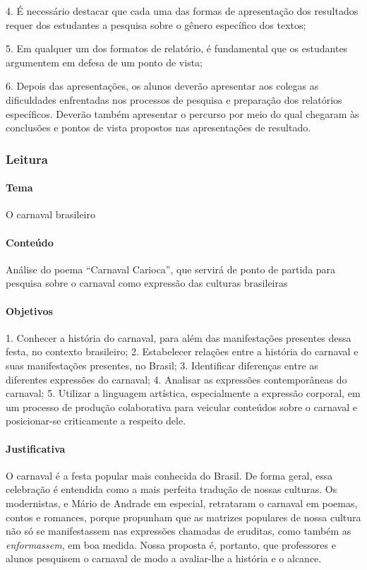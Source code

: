 \documentclass[11pt]{extarticle}
\begin{document}
4. É necessário destacar que cada uma das formas de apresentação dos
resultados requer dos estudantes a pesquisa sobre o gênero específico
dos textos;

\vspace{3mm}

5. Em qualquer um dos formatos de relatório, é fundamental que os
estudantes argumentem em defesa de um ponto de vista;

\vspace{3mm}

6. Depois das apresentações, os alunos deverão apresentar aos colegas as
dificuldades enfrentadas nos processos de pesquisa e preparação dos
relatórios específicos. Deverão também apresentar o percurso por meio do
qual chegaram às conclusões e pontos de vista propostos nas
apresentações de resultado.

\subsubsection{Leitura}

\paragraph{Tema} O carnaval brasileiro

\paragraph{Conteúdo} Análise do poema ``Carnaval Carioca'', que servirá de
ponto de partida para pesquisa sobre o carnaval como expressão das
culturas brasileiras

\paragraph{Objetivos} 1. Conhecer a história do carnaval, para além das
manifestações presentes dessa festa, no contexto brasileiro; 2.
Estabelecer relações entre a história do carnaval e suas manifestações
presentes, no Brasil; 3. Identificar diferenças entre as diferentes
expressões do carnaval; 4. Analisar as expressões contemporâneas do
carnaval; 5. Utilizar a linguagem artística, especialmente a expressão
corporal, em um processo de produção colaborativa para veicular
conteúdos sobre o carnaval e posicionar-se criticamente a respeito dele.

\paragraph{Justificativa} O carnaval é a festa popular mais conhecida do
Brasil. De forma geral, essa celebração é entendida como a mais perfeita
tradução de nossas culturas. Os modernistas, e Mário de Andrade em
especial, retrataram o carnaval em poemas, contos e romances, porque
propunham que as matrizes populares de nossa cultura não só se
manifestassem nas expressões chamadas de eruditas, como também as
\emph{enformassem}, em boa medida. Nossa proposta é, portanto, que
professores e alunos pesquisem o carnaval de modo a avaliar-lhe a
história e o alcance.
\end{document}

